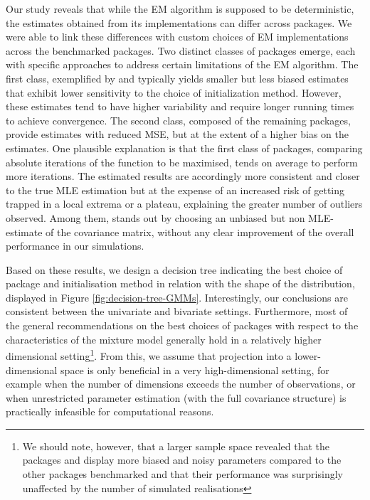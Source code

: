 Our study reveals that while the EM algorithm is supposed to be deterministic, the estimates obtained from its implementations can differ across packages. We were able to link these differences with custom choices of EM implementations across the benchmarked packages.
Two distinct classes of packages emerge, each with specific approaches to address certain limitations of the EM algorithm. The first class, exemplified by  and  typically yields smaller but less biased estimates that exhibit lower sensitivity to the choice of initialization method. However, these estimates tend to have higher variability and require longer running times to achieve convergence. The second class, composed of the remaining packages, provide estimates with reduced MSE, but at the extent of a higher bias on the estimates. One plausible explanation is that the first class of packages, comparing absolute iterations of the function to be maximised, tends on average to perform more iterations. The estimated results are accordingly more consistent and closer to the true MLE estimation but at the expense of an increased risk of getting trapped in a local extrema or a plateau, explaining the greater number of outliers observed. Among them,  stands out by choosing
an unbiased but non MLE-estimate of the covariance matrix, without any clear improvement of the overall performance in our simulations.

Based on these results, we design a decision tree indicating the best choice of package and initialisation method in relation with the shape of the distribution, displayed in Figure \ref{fig:decision-tree-GMMs}. Interestingly, our conclusions are consistent between the univariate and bivariate settings. Furthermore, most of the general recommendations on the best choices of packages with respect to the characteristics of the mixture model generally hold in a relatively higher dimensional setting\footnote{We should note, however, that a larger sample space revealed that the packages  and  display more biased and noisy parameters compared to the other packages benchmarked and that their performance was surprisingly unaffected by the number of simulated realisations}. From this, we assume that projection into a lower-dimensional space is only beneficial in a very high-dimensional setting, for example when the number of dimensions exceeds the number of observations, or when unrestricted parameter estimation (with the full covariance structure) is practically infeasible for computational reasons.

